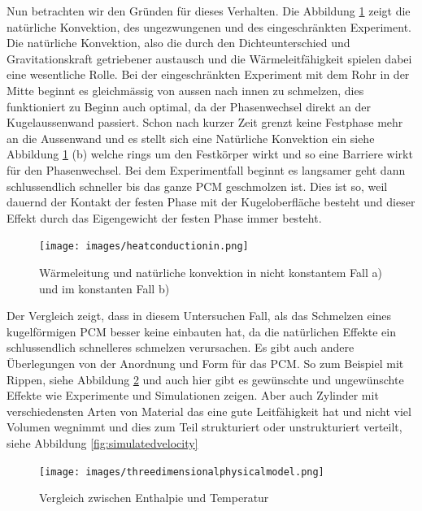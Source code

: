 \documentclass[11pt,a4paper]{scrartcl}
\begin{document}
Nun betrachten wir den Gründen für dieses Verhalten. Die Abbildung \ref{fig:heatconductionin} zeigt die natürliche Konvektion, des ungezwungenen und des eingeschränkten Experiment. Die natürliche Konvektion, also die durch den Dichteunterschied und Gravitationskraft getriebener austausch und die Wärmeleitfähigkeit spielen dabei eine wesentliche Rolle. Bei der eingeschränkten Experiment mit dem Rohr in der Mitte beginnt es gleichmässig von aussen nach innen zu schmelzen, dies funktioniert zu Beginn auch optimal, da der Phasenwechsel direkt an der Kugelaussenwand passiert. Schon nach kurzer Zeit grenzt keine Festphase mehr an die Aussenwand und es stellt sich eine Natürliche Konvektion ein siehe Abbildung \ref{fig:heatconductionin} (b) welche rings um den Festkörper wirkt und so eine Barriere wirkt für den Phasenwechsel. Bei dem Experimentfall beginnt es langsamer geht dann schlussendlich schneller bis das ganze PCM geschmolzen ist. Dies ist so, weil dauernd der Kontakt der festen Phase mit der Kugeloberfläche besteht und dieser Effekt durch das Eigengewicht der festen Phase immer besteht. 

\begin{figure}[h!]
\begin{center}
\texttt{[image: images/heatconductionin.png]}
\caption{Wärmeleitung und natürliche konvektion in nicht konstantem Fall a) und im konstanten Fall b) \cite{WasteEnergyHarvesting}}
\label{fig:heatconductionin}
\end{center}
\end{figure}

Der Vergleich zeigt, dass in diesem Untersuchen Fall, als das Schmelzen eines kugelförmigen PCM besser keine einbauten hat, da die natürlichen Effekte ein schlussendlich schnelleres schmelzen verursachen.
Es gibt auch andere Überlegungen von der Anordnung und Form für das PCM. So zum Beispiel mit Rippen, siehe Abbildung \ref{fig:threedimensionalphysicalmodel} und auch hier gibt es gewünschte und ungewünschte Effekte wie Experimente und Simulationen zeigen. Aber auch Zylinder mit verschiedensten Arten von Material das eine gute Leitfähigkeit hat und nicht viel Volumen wegnimmt und dies zum Teil strukturiert oder unstrukturiert verteilt, siehe Abbildung \ref{fig:simulatedvelocity}

\begin{figure}[h!]
\begin{center}
\texttt{[image: images/threedimensionalphysicalmodel.png]}
\caption{Vergleich zwischen Enthalpie und Temperatur \cite{WasteEnergyHarvesting}}
\label{fig:threedimensionalphysicalmodel}
\end{center}
\end{figure}
\end{document}
